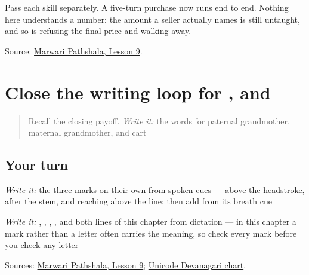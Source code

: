Pass each skill separately. A five-turn purchase now runs end to end. Nothing here understands a number: the amount a seller actually names is still untaught, and so is refusing the final price and walking away.

\begin{tcolorbox}[breakable,colback=teal!4,colframe=teal!35!black,title={Before you move on}]
Source: \href{https://www.marwaripathshala.com/marwari-lesson-9-english}{Marwari Pathshala, Lesson 9}.
\end{tcolorbox}
\section[Practice]{Close the writing loop for ,  and }

\label{lesson:MW-R24-script-close}



\begin{quote}
Recall the closing payoff. \emph{Write it:} the words for paternal grandmother, maternal grandmother, and cart
\end{quote}

\subsection*{Your turn}
\emph{Write it:} the three marks on their own from spoken cues — above the headstroke, after the stem, and reaching above the line; then add \textbf{} from its breath cue

\emph{Write it:} \textbf{}, \textbf{}, \textbf{}, \textbf{}, and both lines of this chapter from dictation — in this chapter a mark rather than a letter often carries the meaning, so check every mark before you check any letter

\begin{tcolorbox}[breakable,colback=teal!4,colframe=teal!35!black,title={Before you move on}]
Sources: \href{https://www.marwaripathshala.com/marwari-lesson-9-english}{Marwari Pathshala, Lesson 9}; \href{https://www.unicode.org/charts/PDF/U0900.pdf}{Unicode Devanagari chart}.
\end{tcolorbox}
